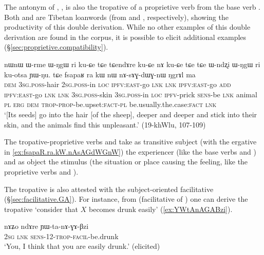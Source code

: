 The antonym of  , , is also the tropative of a proprietive verb  from the base verb . Both  and  are Tibetan loanwords (from  and , respectively), showing the productivity of this double derivation. While no other examples of this double derivation are found in the corpus, it is possible to elicit additional examples (§\ref{sec:proprietive.compatibility}).

\begin{exe}
\ex \label{ex:fsapaR.ra.kW.nAsAGdWGnW}
\gll nɯnɯ ɯ-rme ɯ-ŋgɯ ri ku-ɕe tɕe tɕendɤre ku-ɕe nɤ ku-ɕe tɕe tɕe ɯ-ndʐi ɯ-ŋgɯ ri ku-otsa ɲɯ-ŋu. tɕe fsapaʁ ra kɯ nɯ nɤ-sɤɣ-dɯɣ-nɯ ŋgrɤl ma \\
\textsc{dem} \textsc{3sg}.\textsc{poss}-hair \textsc{2sg}.\textsc{poss}-in \textsc{loc} \textsc{ipfv}:\textsc{east}-go \textsc{lnk} \textsc{lnk} \textsc{ipfv}:\textsc{east}-go \textsc{add} \textsc{ipfv}:\textsc{east}-go \textsc{lnk} \textsc{lnk} \textsc{3sg}.\textsc{poss}-skin \textsc{3sg}.\textsc{poss}-in \textsc{loc} \textsc{ipfv}-prick \textsc{sens}-be \textsc{lnk} animal \textsc{pl} \textsc{erg} \textsc{dem} \textsc{trop}-\textsc{prop}-be.upset:\textsc{fact}-\textsc{pl} be.usually.the.case:\textsc{fact} \textsc{lnk} \\
\glt `[Its seeds] go into the hair [of the sheep], deeper and deeper and stick into their skin, and the animals find this unpleasant.' (19-khWlu, 107-109)
\end{exe}

The tropative-proprietive verbs  and  take as transitive subject (with the ergative in \ref{ex:fsapaR.ra.kW.nAsAGdWGnW}) the experiencer (like the base verbs  and ) and as object the stimulus (the situation or place causing the feeling, like the proprietive verbs  and ).

The tropative is also attested with the subject-oriented facilitative  (§\ref{sec:facilitative.GA}). For instance, from  (facilitative of ) one can derive the tropative  `consider that $X$ becomes drunk easily' (\ref{ex:YWtAnAGABzi}).

\begin{exe}
\ex \label{ex:YWtAnAGABzi}
\gll nɤʑo ndɤre ɲɯ-ta-nɤ-ɣɤ-βzi  \\
\textsc{2sg} \textsc{lnk} \textsc{sens}-1\fl{}2-\textsc{trop}-\textsc{facil}-be.drunk \\
\glt `You, I think that you are easily drunk.' (elicited)
\end{exe}

